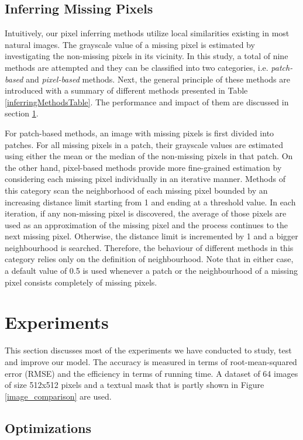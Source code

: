 \documentclass[conference]{IEEEtran}
\begin{document}
\subsection{Inferring Missing Pixels}\label{inferringMethods}
Intuitively, our pixel inferring methods utilize local similarities existing in most natural images. The grayscale value of a missing pixel is estimated by investigating the non-missing pixels in its vicinity. In this study, a total of nine methods are attempted and they can be classified into two categories, i.e. \textit{patch-based} and \textit{pixel-based} methods. Next, the general principle of these methods are introduced with a summary of different methods presented in Table \ref{inferringMethodsTable}. The performance and impact of them are discussed in section \ref{exp}.

For patch-based methods, an image with missing pixels is first divided into patches. For all missing pixels in a patch, their grayscale values are estimated using either the mean or the median of the non-missing pixels in that patch. On the other hand, pixel-based methods provide more fine-grained estimation by considering each missing pixel individually in an iterative manner. Methods of this category scan the neighborhood of each missing pixel bounded by an increasing distance limit starting from 1 and ending at a threshold value. In each iteration, if any non-missing pixel is discovered, the average of those pixels are used as an approximation of the missing pixel and the process continues to the next missing pixel. Otherwise, the distance limit is incremented by 1 and a bigger neighbourhood is searched. Therefore, the behaviour of different methods in this category relies only on the definition of  neighbourhood. Note that in either case, a default value of 0.5 is used whenever a patch or the neighbourhood of a missing pixel consists completely of missing pixels.

\section{Experiments}\label{exp}
This section discusses most of the experiments we have conducted to study, test and improve our model. The accuracy is measured in terms of root-mean-squared error (RMSE) and the efficiency in terms of running time. A dataset of 64 images \cite{dataset} of size 512x512 pixels and a textual mask that is partly shown in Figure \ref{image_comparison} are used.

\subsection{Optimizations}
\end{document}
